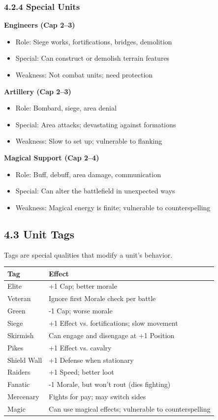 \documentclass[11pt]{article}
\begin{document}
\subsubsection{4.2.4 Special Units}

\textbf{Engineers (Cap 2–3)}\\
\begin{itemize}
  \item Role: Siege works, fortifications, bridges, demolition
  \item Special: Can construct or demolish terrain features
  \item Weakness: Not combat units; need protection
\end{itemize}

\textbf{Artillery (Cap 2–3)}\\
\begin{itemize}
  \item Role: Bombard, siege, area denial
  \item Special: Area attacks; devastating against formations
  \item Weakness: Slow to set up; vulnerable to flanking
\end{itemize}

\textbf{Magical Support (Cap 2–4)}\\
\begin{itemize}
  \item Role: Buff, debuff, area damage, communication
  \item Special: Can alter the battlefield in unexpected ways
  \item Weakness: Magical energy is finite; vulnerable to counterspelling
\end{itemize}

\subsection{4.3 Unit Tags}

Tags are special qualities that modify a unit's behavior.

\begin{tabular}{|l|l|}
\hline
Tag & Effect \\
\hline
Elite & +1 Cap; better morale \\
\hline
Veteran & Ignore first Morale check per battle \\
\hline
Green & -1 Cap; worse morale \\
\hline
Siege & +1 Effect vs. fortifications; slow movement \\
\hline
Skirmish & Can engage and disengage at +1 Position \\
\hline
Pikes & +1 Effect vs. cavalry \\
\hline
Shield Wall & +1 Defense when stationary \\
\hline
Raiders & +1 Speed; better loot \\
\hline
Fanatic & -1 Morale, but won't rout (dies fighting) \\
\hline
Mercenary & Fights for pay; may switch sides \\
\hline
Magic & Can use magical effects; vulnerable to counterspelling \\
\hline
\end{tabular}
\end{document}
